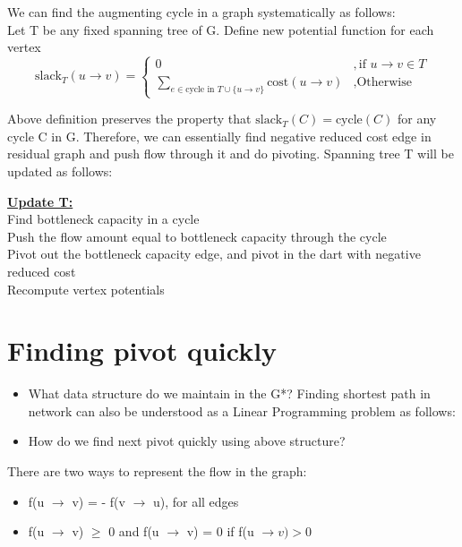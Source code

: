 \documentclass{article}
\begin{document}
We can find the augmenting cycle in a graph systematically as follows: \\
Let T be any fixed spanning tree of G. Define new potential function for each vertex
\[ \text{slack}_{T}(u \rightarrow v) = \begin{cases} 0 & ,\mbox{if } u \rightarrow v \in T \\
  \sum \limits_{e \in \text{cycle in } T \cup \{u \rightarrow v\} } 
    \text{cost}(u \rightarrow v) & ,\mbox{Otherwise } \end{cases}\]

Above definition preserves the property that $\text{slack}_T(C) = \text{cycle}(C)$ 
for any cycle C in G. Therefore, we can essentially find negative reduced cost 
edge in residual graph and push flow through it and do pivoting. 
Spanning tree T will be updated as follows: \\

\begin{center}
\begin{algorithm}
\textbf{\underline{Update T:}} \\ \quad
  Find bottleneck capacity in a cycle \\ \quad
  Push the flow amount equal to bottleneck capacity through the cycle \\ \quad
  Pivot out the bottleneck capacity edge, and pivot in the dart with negative reduced cost \\ \quad
  Recompute vertex potentials
\end{algorithm}
\end{center}

\section{Finding pivot quickly}
\begin{itemize}
\item What data structure do we maintain in the G*?
Finding shortest path in network can also be understood as a Linear Programming problem as follows:

\item How do we find next pivot quickly using above structure?
\end{itemize}

There are two ways to represent the flow in the graph:
\begin{itemize}
\item f(u $\rightarrow$ v) = - f(v $\rightarrow$ u), for all edges
\item f(u $\rightarrow$ v) $\geq$ 0 and f(u $\rightarrow$ v) = 0 if f(u $\rightarrow v) > 0$
\end{itemize}
\end{document}
